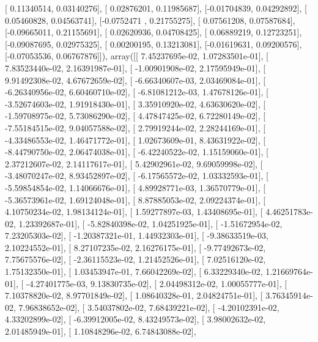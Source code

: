 \documentclass{article}
\begin{document}
       [ 0.11340514,  0.03140276],
       [ 0.02876201,  0.11985687],
       [-0.01704839,  0.04292892],
       [ 0.05460828,  0.04563741],
       [-0.0752471 ,  0.21755275],
       [ 0.07561208,  0.07587684],
       [-0.09665011,  0.21155691],
       [ 0.02620936,  0.04708425],
       [ 0.06889219,  0.12723251],
       [-0.09087695,  0.02975325],
       [ 0.00200195,  0.13213081],
       [-0.01619631,  0.09200576],
       [-0.07053536,  0.06767876]]), array([[  7.45237695e-02,   1.07283501e-01],
       [  7.83523440e-02,   2.16391987e-01],
       [ -1.00901908e-02,   2.17595949e-01],
       [  9.91492308e-02,   4.67672659e-02],
       [ -6.66340607e-03,   2.03469084e-01],
       [ -6.26340956e-02,   6.60460710e-02],
       [ -6.81081212e-03,   1.47678126e-01],
       [ -3.52674603e-02,   1.91918430e-01],
       [  3.35910920e-02,   4.63630620e-02],
       [ -1.59708975e-02,   5.73086290e-02],
       [  4.47847425e-02,   6.72280149e-02],
       [ -7.55184515e-02,   9.04057588e-02],
       [  2.79919244e-02,   2.28244169e-01],
       [ -4.33486553e-02,   1.46471772e-01],
       [  1.02673609e-01,   8.43631922e-02],
       [ -8.44790750e-02,   2.06474038e-01],
       [ -6.42240522e-02,   1.15159060e-01],
       [  2.37212607e-02,   2.14117617e-01],
       [  5.42902961e-02,   9.69059998e-02],
       [ -3.48070247e-02,   8.93452897e-02],
       [ -6.17565572e-02,   1.03332593e-01],
       [ -5.59854854e-02,   1.14066676e-01],
       [  4.89928771e-03,   1.36570779e-01],
       [ -5.36573961e-02,   1.69124048e-01],
       [  8.87885053e-02,   2.09224374e-01],
       [  4.10750234e-02,   1.98134124e-01],
       [  1.59277897e-03,   1.43408695e-01],
       [  4.46251783e-02,   1.23392687e-01],
       [ -5.82840398e-02,   1.04251925e-01],
       [ -1.51672954e-02,   7.23205303e-02],
       [ -1.20387321e-01,   1.44932303e-01],
       [ -9.38633519e-03,   2.10224552e-01],
       [  8.27107235e-02,   2.16276175e-01],
       [ -9.77492673e-02,   7.75675576e-02],
       [ -2.36115523e-02,   1.21452526e-01],
       [  7.02516120e-02,   1.75132350e-01],
       [  1.03453947e-01,   7.66042269e-02],
       [  6.33229340e-02,   1.21669764e-01],
       [ -4.27401775e-03,   9.13830735e-02],
       [  2.04498312e-02,   1.00055777e-01],
       [  7.10378820e-02,   8.97701849e-02],
       [  1.08640328e-01,   2.04824751e-01],
       [  3.76345914e-02,   7.96838652e-02],
       [  3.54037802e-02,   7.68439221e-02],
       [ -4.20102391e-02,   4.33202899e-02],
       [ -6.39912005e-02,   8.43249573e-02],
       [  3.98002632e-02,   2.01485949e-01],
       [  1.10848296e-02,   6.74843088e-02],
\end{document}
